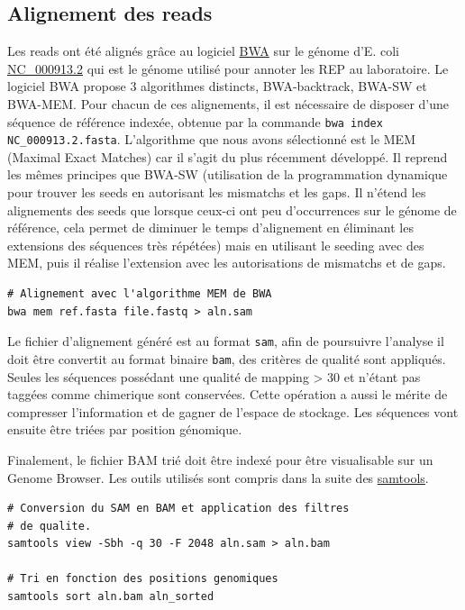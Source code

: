 \documentclass[12pt,a4paper]{report}
\begin{document}
\begin{onehalfspace}
\section*{Alignement des reads}
Les reads ont été alignés grâce au logiciel \href{http://bio-bwa.sourceforge.net/}{BWA} sur le génome d'E. coli \href{http://www.ncbi.nlm.nih.gov/nuccore/NC_000913.2}{NC\_000913.2} qui est le génome utilisé pour annoter les REP au laboratoire.  Le logiciel BWA propose 3 algorithmes distincts, BWA-backtrack, BWA-SW et BWA-MEM. Pour chacun de ces alignements, il est nécessaire de disposer d'une séquence de référence indexée, obtenue par la commande \texttt{bwa index NC\_000913.2.fasta}. 
L'algorithme que nous avons sélectionné est le MEM (Maximal Exact Matches) car il s'agit du plus récemment développé. Il reprend les mêmes principes que BWA-SW (utilisation de la programmation dynamique pour trouver les seeds en autorisant les mismatchs et les gaps. Il n'étend les alignements des seeds que lorsque ceux-ci ont peu d'occurrences sur le génome de référence, cela permet de diminuer le temps d'alignement en éliminant les extensions des séquences très répétées) mais en utilisant le seeding avec des MEM, puis il réalise l'extension avec les autorisations de mismatchs et de gaps.
\begin{lstlisting}[frame=single]
# Alignement avec l'algorithme MEM de BWA
bwa mem ref.fasta file.fastq > aln.sam
\end{lstlisting}
Le fichier d'alignement généré est au format \texttt{\gls{sam}}, afin de poursuivre l'analyse il doit être convertit au format binaire \texttt{\gls{bam}}, des critères de qualité sont appliqués. Seules les séquences possédant une qualité de mapping > 30 et n'étant pas taggées comme \gls{chimerique} sont conservées. Cette opération a aussi le mérite de compresser l'information et de gagner de l'espace de stockage. Les séquences vont ensuite être triées par position génomique.

Finalement, le fichier BAM trié doit être indexé pour être visualisable sur un Genome Browser. Les outils utilisés sont compris dans la suite des \href{http://samtools.sourceforge.net/samtools.shtml}{samtools}.
\begin{lstlisting}[frame=single]
# Conversion du SAM en BAM et application des filtres
# de qualite.
samtools view -Sbh -q 30 -F 2048 aln.sam > aln.bam

# Tri en fonction des positions genomiques
samtools sort aln.bam aln_sorted


\end{lstlisting}
\end{onehalfspace}
\end{document}
